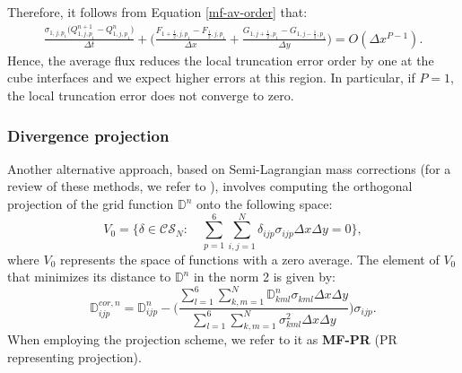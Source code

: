 Therefore, it follows from Equation \eqref{mf-av-order} that:
\begin{align*}
	\frac{\sigma_{1,j,p_1} \big(Q_{1,j,p_1}^{n+1}- Q_{1,j,p_1}^n\big)}{\Delta t} +
	\bigg(
	\frac{F_{1+\frac{1}{2},j,p_1}-F_{\frac{1}{2},j,p_1}}{\Delta x}+
	\frac{G_{1,j+\frac{1}{2},p_1}-G_{1,j-\frac{1}{2},p_1}}{\Delta y} \bigg)
	= O(\Delta x^{P-1}).
\end{align*}
Hence, the average flux reduces the local truncation
error order by one at the cube interfaces and we expect higher errors at this region.
In particular, if $P=1$, the local truncation error does not converge to zero.
\subsubsection{Divergence projection}
\label{mf-pr}
Another alternative approach, based on Semi-Lagrangian mass corrections
(for a review of these methods, we refer to \citet{diamantakis:2014}),
involves computing the orthogonal projection of the grid function $\mathbb{D}^n$ onto the following space:
\begin{equation*}
	V_0 = \{ \delta \in \mathcal{CS}_N: \quad
		\sum_{p=1}^6 \sum_{i,j=1}^N \mathbb{\delta}_{ijp} \sigma_{ijp} \Delta x \Delta y = 0\},
\end{equation*}
where $V_0$ represents the space of functions with a zero average.
The element of $V_0$ that minimizes its distance to $\mathbb{D}^n$ in the norm 2 is given by:
\begin{equation}
\label{dcor-eq1}
\mathbb{D}^{cor,n}_{ijp} = \mathbb{D}^n_{ijp} - \bigg(\frac{	\sum_{l=1}^6 \sum_{k,m=1}^N \mathbb{D}_{kml}^n \sigma_{kml} \Delta x \Delta y}
 {\sum_{l=1}^6 \sum_{k,m=1}^N \sigma_{kml}^2 \Delta x \Delta y}\bigg)\sigma_{ijp}.
\end{equation}
When employing the projection scheme, we refer to it as \textbf{MF-PR} (PR representing projection).

